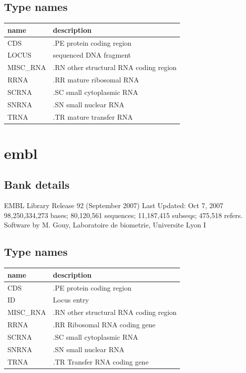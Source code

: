 \documentclass{article}
\begin{document}
\begin{Schunk}
\subsection{Type names}
\noindent\begin{tabular}{ll}
\hline \hline
name & description\\
\hline
CDS & .PE protein coding region \\
LOCUS & sequenced DNA fragment \\
MISC\_RNA & .RN other structural RNA coding region \\
RRNA & .RR mature ribosomal RNA \\
SCRNA & .SC small cytoplasmic RNA \\
SNRNA & .SN small nuclear RNA \\
TRNA & .TR mature transfer RNA \\
\hline \hline
\end{tabular}

\section{ embl }
\subsection{Bank details}
EMBL Library Release 92 (September 2007) Last Updated: Oct  7, 2007\\
98,250,334,273 bases; 80,120,561 sequences; 11,187,415 subseqs; 475,518 refers.\\
Software by M. Gouy, Laboratoire de biometrie, Universite Lyon I

\subsection{Type names}
\noindent\begin{tabular}{ll}
\hline \hline
name & description\\
\hline
CDS & .PE protein coding region \\
ID & Locus entry \\
MISC\_RNA & .RN other structural RNA coding region \\
RRNA & .RR Ribosomal RNA coding gene \\
SCRNA & .SC small cytoplasmic RNA \\
SNRNA & .SN small nuclear RNA \\
TRNA & .TR Transfer RNA coding gene \\
\hline \hline
\end{tabular}


\end{Schunk}
\end{document}
